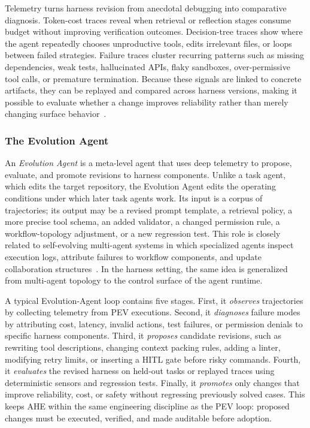Telemetry turns harness revision from anecdotal debugging into comparative diagnosis. Token-cost traces reveal when retrieval or reflection stages consume budget without improving verification outcomes. Decision-tree traces show where the agent repeatedly chooses unproductive tools, edits irrelevant files, or loops between failed strategies. Failure traces cluster recurring patterns such as missing dependencies, weak tests, hallucinated APIs, flaky sandboxes, over-permissive tool calls, or premature termination. Because these signals are linked to concrete artifacts, they can be replayed and compared across harness versions, making it possible to evaluate whether a change improves reliability rather than merely changing surface behavior~\cite{jimenez2024swebench, feng2026longcli}.

\subsubsection{The Evolution Agent}
An \emph{Evolution Agent} is a meta-level agent that uses deep telemetry to propose, evaluate, and promote revisions to harness components. Unlike a task agent, which edits the target repository, the Evolution Agent edits the operating conditions under which later task agents work. Its input is a corpus of trajectories; its output may be a revised prompt template, a retrieval policy, a more precise tool schema, an added validator, a changed permission rule, a workflow-topology adjustment, or a new regression test. This role is closely related to self-evolving multi-agent systems in which specialized agents inspect execution logs, attribute failures to workflow components, and update collaboration structures~\cite{Hu2025EvoMAC,zou2025latentmas}. In the harness setting, the same idea is generalized from multi-agent topology to the control surface of the agent runtime.

A typical Evolution-Agent loop contains five stages. First, it \emph{observes} trajectories by collecting telemetry from PEV executions. Second, it \emph{diagnoses} failure modes by attributing cost, latency, invalid actions, test failures, or permission denials to specific harness components. Third, it \emph{proposes} candidate revisions, such as rewriting tool descriptions, changing context packing rules, adding a linter, modifying retry limits, or inserting a HITL gate before risky commands. Fourth, it \emph{evaluates} the revised harness on held-out tasks or replayed traces using deterministic sensors and regression tests. Finally, it \emph{promotes} only changes that improve reliability, cost, or safety without regressing previously solved cases. This keeps AHE within the same engineering discipline as the PEV loop: proposed changes must be executed, verified, and made auditable before adoption.

